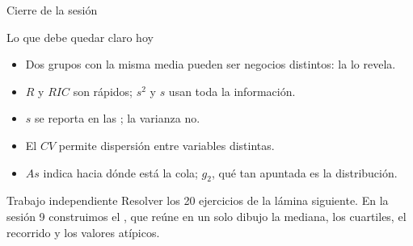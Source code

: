 \documentclass[aspectratio=169,10pt]{beamer}
\begin{document}
\begin{frame}{Cierre de la sesión}
  \begin{block}{Lo que debe quedar claro hoy}
    \scriptsize
    \begin{itemize}\setlength{\itemsep}{0.02cm}
      \item Dos grupos con la misma media pueden ser negocios distintos: la
             lo revela.
      \item $R$ y $RIC$ son rápidos; $s^2$ y $s$ usan toda la información.
      \item $s$ se reporta en las ; la varianza no.
      \item El $CV$ permite  dispersión entre variables
            distintas.
      \item $As$ indica hacia dónde está la cola; $g_2$, qué tan apuntada es
            la distribución.
    \end{itemize}
  \end{block}

  \vspace{0.1cm}
  \begin{alertblock}{Trabajo independiente}
    \scriptsize
    Resolver los 20 ejercicios de la lámina siguiente. En la sesión 9
    construimos el , que reúne en un solo dibujo la
    mediana, los cuartiles, el recorrido y los valores atípicos.
  \end{alertblock}
\end{frame}
\end{document}
